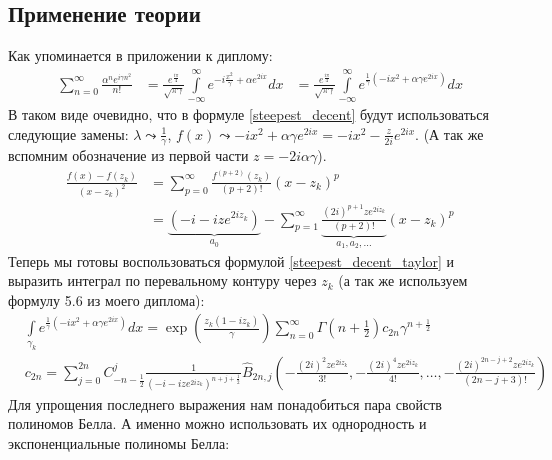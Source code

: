 \documentclass[a4paper, 12pt]{article}
\begin{document}
\subsection*{Применение теории}
Как упоминается в приложении к диплому:
\begin{equation}
\begin{aligned}
    \sum\limits_{n=0}^{\infty} \frac{\alpha^n e^{i\gamma n^2}}{n!} 
    &= \frac{e^{\frac{i\pi}{4}}}{\sqrt{\pi\gamma}}
    \int\limits_{-\infty}^{\infty}e^{-i \frac{x^2}{\gamma} + \alpha e^{2ix}}dx
    &= \frac{e^{\frac{i\pi}{4}}}{\sqrt{\pi\gamma}}
    \int\limits_{-\infty}^{\infty}e^{\frac{1}{\gamma}\left(-i x^2 + \alpha \gamma e^{2ix}\right)}dx
\end{aligned}
\end{equation}
В таком виде очевидно, что в формуле \ref{steepest_decent} будут использоваться следующие замены: $\lambda\leadsto\frac{1}{\gamma}$, $f(x) \leadsto -i x^2 + \alpha \gamma e^{2ix} = -i x^2 - \frac{z}{2i} e^{2ix}$. (А так же вспомним обозначение из первой части $z=-2i\alpha\gamma$).
\begin{equation}
\begin{aligned}
    \frac{f(x) - f(z_k)}{(x-z_k)^2} 
    &=  \sum\limits_{p=0}^{\infty} \frac{f^{(p+2)}(z_k)}{(p+2)!}(x-z_k)^{p}\\
    &=  \underbrace{\left(-i - iz e^{2iz_k}\right)}_{a_0} - \sum\limits_{p=1}^{\infty} \underbrace{\frac{(2i)^{p+1}ze^{2iz_k}}{(p+2)!}}_{a_1, a_2, \dots}(x-z_k)^{p}
\end{aligned}
\end{equation}
Теперь мы готовы воспользоваться формулой \ref{steepest_decent_taylor} и выразить интеграл по перевальному контуру через $z_k$ (а так же используем формулу 5.6 из моего диплома):
\begin{equation}
\begin{aligned}
    &\int\limits_{\gamma_k}e^{\frac{1}{\gamma}\left(-i x^2 + \alpha \gamma e^{2ix}\right)}dx 
    = \exp\left(\frac{z_k(1-i z_k)}{\gamma}\right)\sum\limits_{n=0}^{\infty} \Gamma\left(n+\frac{1}{2}\right)c_{2n}\gamma^{n+\frac{1}{2}}\\
    &c_{2n} = 
    \sum\limits_{j=0}^{2n} C_{-n-\frac{1}{2}}^j\frac{1}{\left(-i - iz e^{2iz_k}\right)^{n+j+\frac{1}{2}}}
    \hat{B}_{2n, j}\left(-\frac{(2i)^{2}ze^{2iz_k}}{3!}, -\frac{(2i)^{4}ze^{2iz_k}}{4!}, \dots, -\frac{(2i)^{2n-j+2}ze^{2iz_k}}{(2n-j+3)!}\right)
\end{aligned}
\end{equation}
Для упрощения последнего выражения нам понадобиться пара свойств полиномов Белла. А именно можно использовать их однородность и экспоненциальные полиномы Белла:
\end{document}
